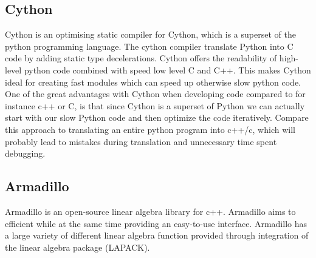 \subsection*{Cython}
Cython is an optimising static compiler for Cython, which is a superset of the
python programming language. The cython compiler translate Python into C code by
adding static type decelerations. Cython offers the readability of high-level
python code combined with speed low level C and C++. This makes Cython ideal for
creating fast modules which can speed up otherwise slow python code. One of the
great advantages with Cython when developing code compared to for instance c++
or C, is that since Cython is a superset of Python we can actually start with
our slow Python code and then optimize the code iteratively. Compare this
approach to translating an entire python program into c++/c, which will probably
lead to mistakes during translation and unnecessary time spent debugging.
  
\subsection*{Armadillo}
Armadillo is an open-source linear algebra library for c++. Armadillo aims to
efficient while at the same time providing an easy-to-use interface. Armadillo
has a large variety of different linear algebra function provided through
integration of the linear algebra package (LAPACK).  
